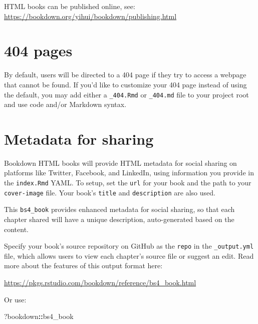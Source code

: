 \documentclass[
]{book}
\newenvironment{Shaded}{\begin{snugshade}}{\end{snugshade}}
\newcommand{\NormalTok}[1]{#1}
\newcommand{\SpecialCharTok}[1]{\textcolor[rgb]{0.81,0.36,0.00}{\textbf{#1}}}
\theoremstyle{definition}
\theoremstyle{definition}
\theoremstyle{definition}
\theoremstyle{definition}
\theoremstyle{remark}
\begin{document}
HTML books can be published online, see: \url{https://bookdown.org/yihui/bookdown/publishing.html}

\section{404 pages}\label{pages}

By default, users will be directed to a 404 page if they try to access a webpage that cannot be found. If you'd like to customize your 404 page instead of using the default, you may add either a \texttt{\_404.Rmd} or \texttt{\_404.md} file to your project root and use code and/or Markdown syntax.

\section{Metadata for sharing}\label{metadata-for-sharing}

Bookdown HTML books will provide HTML metadata for social sharing on platforms like Twitter, Facebook, and LinkedIn, using information you provide in the \texttt{index.Rmd} YAML. To setup, set the \texttt{url} for your book and the path to your \texttt{cover-image} file. Your book's \texttt{title} and \texttt{description} are also used.

This \texttt{bs4\_book} provides enhanced metadata for social sharing, so that each chapter shared will have a unique description, auto-generated based on the content.

Specify your book's source repository on GitHub as the \texttt{repo} in the \texttt{\_output.yml} file, which allows users to view each chapter's source file or suggest an edit. Read more about the features of this output format here:

\url{https://pkgs.rstudio.com/bookdown/reference/bs4_book.html}

Or use:

\begin{Shaded}
\begin{Highlighting}[]
\NormalTok{?bookdown}\SpecialCharTok{::}\NormalTok{bs4\_book}
\end{Highlighting}
\end{Shaded}


  
\end{document}
